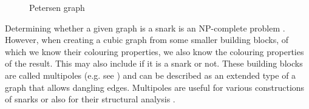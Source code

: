 \begin{figure}
	\centering
	
	\caption{Petersen graph}
	\label{fig:petersen}
\end{figure}

Determining whether a given graph is a snark is an NP-complete problem \cite{HolyerNP}. However, when creating a cubic graph from some smaller building blocks, of which we know their colouring properties, we also know the colouring properties of the result. This may also include if it is a snark or not. These building blocks are called multipoles (e.g. see \cite{Nedela1996}) and can be described as an extended type of a graph that allows dangling edges. Multipoles are useful for various constructions of snarks \cite{IrreducibleSnarksSkoviera,Lukotka15} or also for their structural analysis \cite{ChladnyFactorisation,MorphologyOfSmall}.



%


